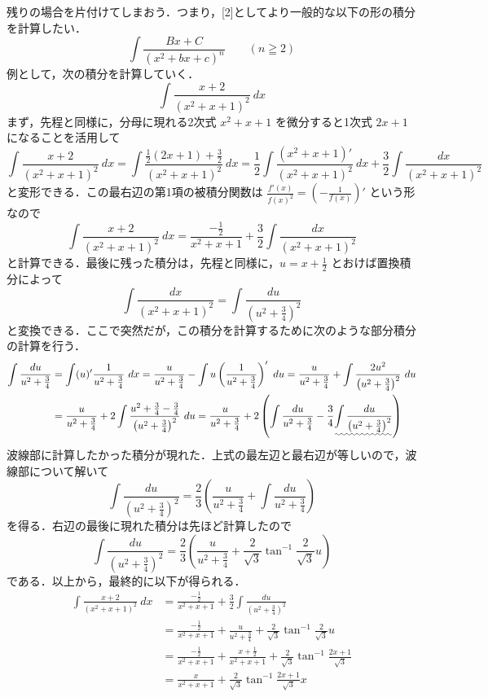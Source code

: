\documentclass[10pt, uplatex, dvipdfmx]{jsarticle}
\theoremstyle{definition}
\numberwithin{equation}{section}
\newcommand{\ds}{\displaystyle}
\begin{document}
残りの場合を片付けてしまおう．つまり，[2]としてより一般的な以下の形の積分を計算したい．
\begin{equation}\label{eq:general-quadratic}
  \int \frac{Bx+C}{(x^2+bx+c)^n} \qquad (n \geqq 2)
\end{equation}
例として，次の積分を計算していく．
\[
  \int \frac{x+2}{(x^2+x+1)^2} \ dx
\]
まず，先程と同様に，分母に現れる2次式 $x^2+x+1$ を微分すると1次式 $2x+1$ になることを活用して
\[
  \int \frac{x+2} {(x^2+x+1)^2} \ dx = \int \frac{ \frac{1}{2} (2x+1) + \frac{3}{2}}{(x^2+x+1)^2} \ dx
  = \frac{1}{2} \int \frac{ (x^2+x+1)'}{(x^2+x+1)^2} \ dx + \frac{3}{2} \int \frac{dx}{(x^2+x+1)^2}
\]
と変形できる．この最右辺の第1項の被積分関数は $\ds  \frac{f'(x)}{f(x)^2} = \left( -\frac{1}{f(x)}\right)'$ という形なので
\[
  \int \frac{x+2}{(x^2+x+1)^2} \ dx = \frac{-\frac{1}{2}}{x^2+x+1} + \frac{3}{2}\int\frac{dx}{(x^2+x+1)^2}
\]
と計算できる．最後に残った積分は，先程と同様に，$\ds u=x+\frac{1}{2}$ とおけば置換積分によって
\[
  \int \frac{dx}{(x^2+x+1)^2} = \int \frac{du}{\left(u^2+\frac{3}{4}\right)^2}
\]
と変換できる．ここで突然だが，この積分を計算するために次のような部分積分の計算を行う．
\begin{equation}\label{eq:lin2sq}
  \begin{aligned}
    \int \frac{du}{u^2+\frac{3}{4}}
    &= \int (u)'
      \frac{1}{u^2+\frac{3}{4}} \ dx = \frac{u}{u^2+\frac{3}{4}} - \int u
      \left(\frac{1}{u^2+\frac{3}{4}}\right)' \ du
      = \frac{u}{u^2+\frac{3}{4}} +\int \frac{2u^2}{\left(u^2+\frac{3}{4}\right)^2} \ du\\
    &= \frac{u}{u^2+\frac{3}{4}} + 2\int \frac{u^2 + \frac{3}{4} - \frac{3}{4}}{\left(u^2+\frac{3}{4}\right)^2} \ du
      = \frac{u}{u^2+\frac{3}{4}} + 2\left( \int \frac{du}{u^2+\frac{3}{4}}
      - \frac{3}{4}\uwave{\int \frac{du}{\left(u^2+\frac{3}{4}\right)^2}} \right)
  \end{aligned}
\end{equation}
波線部に計算したかった積分が現れた．上式の最左辺と最右辺が等しいので，波線部について解いて
\[
  \int  \frac{du}{\left( u^2 + \frac{3}{4}\right)^2} = \frac{2}{3} \left( \frac{u}{u^2+\frac{3}{4}} + \int \frac{du}{u^2+\frac{3}{4}}\right)
\]
を得る．右辺の最後に現れた積分は先ほど計算したので
\[
  \int \frac{du}{\left( u^2+\frac{3}{4}\right)^2} = \frac{2}{3}\left(
    \frac{u}{u^2+\frac{3}{4}} +
    \frac{2}{\sqrt{3}}\tan^{-1}\frac{2}{\sqrt{3}}u\right) 
\]
である．以上から，最終的に以下が得られる．
\[
  \begin{aligned}
    \int \frac{x+2}{(x^2+x+1)^2} \ dx
    & = \frac{-\frac{1}{2}}{x^2+x+1} + \frac{3}{2}\int \frac{du}{\left(u^2+\frac{3}{4}\right)^2}\\[2ex]
    &  = \frac{-\frac{1}{2}}{x^2+x+1} + \frac{u}{u^2+\frac{3}{4}} + \frac{2}{\sqrt{3}} \tan^{-1}\frac{2}{\sqrt{3}}u\\[2ex]
    & = \frac{-\frac{1}{2}}{x^2+x+1} + \frac{x+\frac{1}{2}}{x^2+x+1} + \frac{2}{\sqrt{3}}\tan^{-1} \frac{2x+1}{\sqrt{3}}\\[2ex]
    & = \frac{x}{x^2+x+1} + \frac{2}{\sqrt{3}}\tan^{-1} \frac{2x+1}{\sqrt{3}}x
  \end{aligned}
\]
\end{document}
